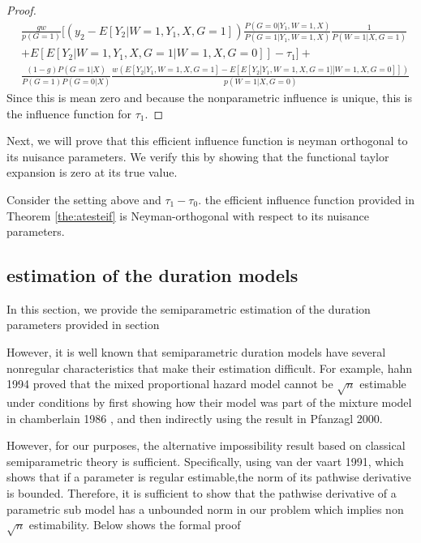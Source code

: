 \documentclass[uplatex,dvipdfmx]{jsarticle}
\begin{document}
\begin{proof}
\begin{align*}
    &\frac{ g w }{ p(G=1) } \biggl[ (y_2 - E[ Y_2 | W=1 , Y_1 , X, G =1]  ) \frac{ P( G =0 | Y_1 , W=1 , X ) }{ P(G=1 | Y_1 , W=1 , X ) } \frac{1}{P( W=1 | X , G=1)}  \\
    &+ E [ E[ Y_2 | W= 1,Y_1 , X, G =1 | W =1, X, G= 0 ] ] - \tau_1    \biggr]  + \\
    &\frac{ (1- g) P(G = 1|X)   }{ P(G= 1) P ( G =0 |X) }  \frac{ w ( E [ Y _ 2 | Y_1,W =1 , X, G =1 ] - E [ E[ Y_2 | Y_1, W=1, X, G=1 ] | W =1, X, G= 0 ] ] ) }{ p (W =1| X, G =0 ) }
    \end{align*}
    Since this is mean zero and because the nonparametric influence is unique, this is the influence function for $\tau_1$.
\end{proof}



Next, we will prove that this efficient influence function is neyman orthogonal to its nuisance parameters. We verify this by showing that the functional taylor expansion is zero at its true value.
\begin{theorem}
Consider the setting above and $\tau_1 - \tau_0$. the efficient influence function provided in Theorem \ref{the:atesteif} is Neyman-orthogonal with respect to its nuisance parameters.
\end{theorem}





\subsection{ estimation of the duration models } 
In this section, we provide the semiparametric estimation of the duration parameters provided in  section \todo

However, it is well known that semiparametric duration models have several nonregular characteristics that make their estimation difficult. For example, %
{hahn 1994} proved that the mixed proportional hazard model cannot be $ \sqrt {n} $ estimable under conditions by first showing how their model was part of the mixture model in %
{chamberlain 1986} , and then indirectly using the result in %
{Pfanzagl  2000}.

However, for our purposes, the alternative impossibility result based on classical semiparametric theory is sufficient. Specifically, using %
{van der vaart 1991}, which shows that if a parameter is regular estimable,the norm of its pathwise derivative is bounded. Therefore, it is sufficient to show that the pathwise derivative of a parametric sub model has a unbounded norm in our problem which implies non $\sqrt{n} $ estimability. Below shows the formal proof \todo
\end{document}
